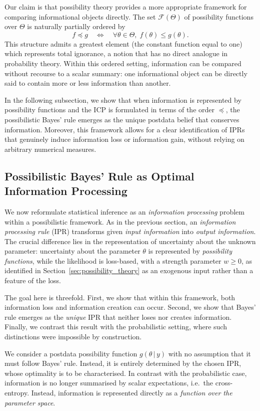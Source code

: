 \documentclass[accepted]{uai2026} %
\def\given{\,|\,}
\theoremstyle{remark}
\begin{document}
Our claim is that possibility theory provides a more appropriate framework for comparing informational objects directly. The set $\mathcal{F}(\Theta)$ of possibility functions over $\Theta$ is naturally partially ordered by
\[
f \preceq g \quad \Longleftrightarrow \quad \forall \theta \in \Theta,\; f(\theta) \leq g(\theta).
\]
This structure admits a greatest element (the constant function equal to one) which represents total ignorance, a notion that has no direct analogue in probability theory. Within this ordered setting, information can be compared without recourse to a scalar summary: one informational object can be directly said to contain more or less information than another.

In the following subsection, we show that when information is represented by possibility functions and the ICP is formulated in terms of the order $\preceq$, the possibilistic Bayes' rule emerges as the unique postdata belief that conserves information. Moreover, this framework allows for a clear identification of IPRs that genuinely induce information loss or information gain, without relying on arbitrary numerical measures.


\subsection{Possibilistic Bayes' Rule as Optimal Information Processing}

We now reformulate statistical inference as an \emph{information processing} problem within a possibilistic framework. As in the previous section, an \emph{information processing rule} (IPR) transforms given \emph{input information} into \emph{output information}. The crucial difference lies in the representation of uncertainty about the unknown parameter: uncertainty about the parameter $\theta$ is represented by \emph{possibility functions}, while the likelihood is loss-based, with a
strength parameter $w \geq 0$, as identified in Section~\ref{sec:possibility_theory} as an exogenous input rather than a feature of the loss.

The goal here is threefold. First, we show that within this framework, both information loss and information creation can occur. Second, we show that Bayes' rule emerges as the \emph{unique} IPR that neither loses nor creates information. Finally, we contrast this result with the probabilistic setting, where such distinctions were impossible by construction.

We consider a postdata possibility function $g(\theta \given y)$ with no assumption that it must follow Bayes' rule. Instead, it is entirely determined by the chosen IPR, whose optimality is to be characterised. In contrast with the probabilistic case, information is no longer summarised by scalar expectations, i.e.\ the cross-entropy. Instead, information is represented directly as a \emph{function over the parameter space}. 
\end{document}

